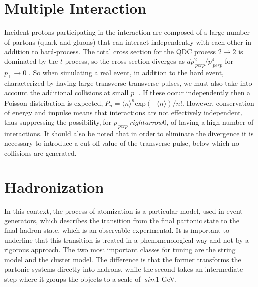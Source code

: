 \section{Multiple Interaction}
Incident protons participating in the interaction are composed of a large number of partons (quark and gluons) that can interact independently with each other in addition to hard-process.
The total cross section for the QDC process $ 2 \rightarrow2 $ is dominated by the $ t $ process, so the cross section diverges as $ d p _ {\ perp} ^ 2 / p _ {\ perp} ^ 4 $ for $ p _ {\perp} \rightarrow 0 $ \cite{Sjostrand: 2006su}.
So when simulating a real event, in addition to the hard event, characterized by having large transverse transverse pulses, we must also take into account the additional collisions at small $ p _{\perp} $. If these occur independently then a Poisson distribution is expected, $ P_n = \langle n \rangle ^ n \mbox {exp} (- \langle n \rangle) / n! $. However, conservation of energy and impulse means that interactions are not effectively independent, thus suppressing the possibility, for $ p _ {\ perp} \ rightarrow 0 $, of having a high number of interactions.
It should also be noted that in order to eliminate the divergence it is necessary to introduce a cut-off value of the transverse pulse, below which no collisions are generated.



\section{Hadronization }
In this context, the process of atomization is a particular model, used in event generators, which describes the transition from the final partonic state to the final hadron state, which is an observable experimental. It is important to underline that this transition is treated in a phenomenological way and not by a rigorous approach. The two most important classes for tuning are the string model and the cluster model. The difference is that the former transforms the partonic systems directly into hadrons, while the second takes an intermediate step where it groups the objects to a scale of $ \ sim 1 $ GeV.

